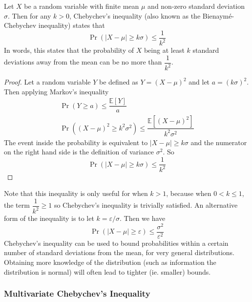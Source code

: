\documentclass[11pt]{report} %
\begin{document}
Let $X$ be a random variable with finite mean $\mu$ and non-zero standard deviation $\sigma$. Then for any $k > 0$, Chebychev's inequality (also known as the Bienaym\'{e}-Chebychev inequality) states that
\begin{equation}
\operatorname{Pr}\left(\left|X - \mu\right| \geq k\sigma\right) \leq \dfrac{1}{k^{2}}
\end{equation}
In words, this states that the probability of $X$ being at least $k$ standard deviations away from the mean can be no more than $\dfrac{1}{k^{2}}$.
\begin{proof}
Let a random variable $Y$ be defined as $Y = \left(X - \mu\right)^{2}$ and let $a = \left(k\sigma\right)^{2}$. Then applying Markov's inequality
\begin{gather}
\operatorname{Pr}\left(Y \geq a\right) \leq \dfrac{\mathbb{E}\left[Y\right]}{a} \\
\operatorname{Pr}\left(\left(X - \mu\right)^{2} \geq k^{2}\sigma^{2}\right) \leq \dfrac{\mathbb{E}\left[\left(X - \mu\right)^{2}\right]}{k^{2}\sigma^{2}}
\end{gather}
The event inside the probability is equivalent to $\left|X - \mu\right| \geq k\sigma$ and the numerator on the right hand side is the definition of variance $\sigma^{2}$. So
\begin{equation}
\operatorname{Pr}\left(\left|X - \mu\right| \geq k\sigma\right) \leq \dfrac{1}{k^{2}}
\end{equation}
\end{proof}
Note that this inequality is only useful for when $k > 1$, because when $0 < k \leq 1$, the term $\dfrac{1}{k^{2}} \geq 1$ so Chebychev's inequality is trivially satisfied. An alternative form of the inequality is to let $k = \varepsilon/\sigma$. Then we have
\begin{equation}
\operatorname{Pr}\left(\left|X - \mu\right| \geq \varepsilon\right) \leq \dfrac{\sigma^{2}}{\varepsilon^{2}}
\end{equation}
Chebychev's inequality can be used to bound probabilities within a certain number of standard deviations from the mean, for very general distributions. Obtaining more knowledge of the distribution (such as information the distribution is normal) will often lead to tighter (ie. smaller) bounds.

\subsubsection{Multivariate Chebychev's Inequality}
\end{document}
